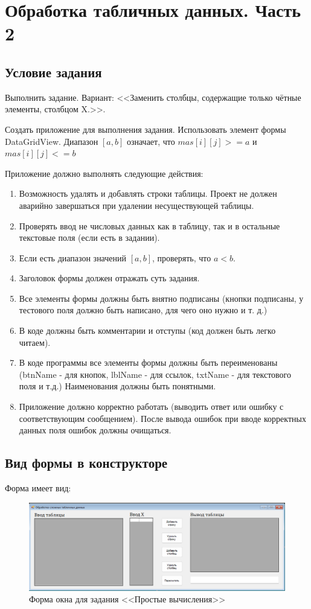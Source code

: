 \section{Обработка табличных данных. Часть 2}
\subsection{Условие задания}
Выполнить задание. Вариант: <<Заменить столбцы, содержащие только чётные элементы, столбцом X.>>.

Создать приложение для выполнения задания. Использовать элемент формы DataGridView. Диапазон $[a,b]$ означает, что $mas[i][j] >= a$ и $mas[i][j] <= b$

Приложение должно выполнять следующие действия:

\begin{enumerate}
\item Возможность удалять и добавлять строки таблицы. Проект не должен аварийно завершаться при удалении несуществующей таблицы.
\item Проверять ввод не числовых данных как в таблицу, так и в остальные текстовые поля (если есть в задании).
\item Если есть диапазон значений $[a,b]$, проверять, что $a < b$.
\item Заголовок формы должен отражать суть задания.
\item Все элементы формы должны быть внятно подписаны (кнопки подписаны, у тестового поля должно быть написано, для чего оно нужно и т. д.)
\item В коде должны быть комментарии и отступы (код должен быть легко читаем).
\item В коде программы все элементы формы должны быть переименованы (btnName -  для кнопок, lblName - для ссылок, txtName - для текстового поля и т.д.) Наименования должны быть понятными.
\item Приложение должно корректно работать (выводить ответ или ошибку с соответствующим сообщением). После вывода ошибок при вводе корректных данных поля ошибок должны очищаться.  
\end{enumerate}

\subsection{Вид формы в конструкторе}
Форма имеет вид:

\begin{figure}
\centering
\includegraphics[width=0.5\linewidth]{images/handling-data-hard/form.png}
\caption{Форма окна для задания <<Простые вычисления>>}
\label{handling-data-hard-form}
\end{figure}

